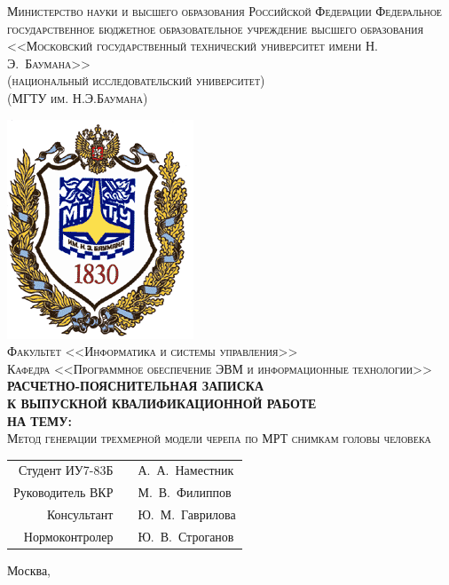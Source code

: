 \newcommand{\HRule}{\rule{\linewidth}{0.5mm}}
\fontsize{14}{14pt}\selectfont
\begin{center}

\textsc{
Министерство науки и высшего образования Российской Федерации
Федеральное государственное бюджетное образовательное учреждение 
высшего образования\\
<<Московский государственный технический университет имени Н.\,Э.~Баумана>>\\
(национальный исследовательский университет)\\
(МГТУ им. Н.Э.Баумана)\\}

\includegraphics[scale=0.5]{tex/bmstu-logo.png}\\

\textsc{Факультет <<Информатика и системы управления>>}\\
\textsc{Кафедра <<Программное обеспечение ЭВМ и информационные технологии>>}\\[1cm]

\textsc{\large \bfseries РАСЧЕТНО-ПОЯСНИТЕЛЬНАЯ ЗАПИСКА\\К ВЫПУСКНОЙ КВАЛИФИКАЦИОННОЙ РАБОТЕ\\НА ТЕМУ:}\\[1cm]

\textsc{\large Метод генерации трехмерной модели черепа по МРТ снимкам головы человека}

\vfill

\begin{flushright}
  \begin{tabular}{rll}
    Студент ИУ7-83Б & \underline{\hspace{6cm}} & А.~А.~Наместник\\[0.5cm]
    Руководитель ВКР & \underline{\hspace{6cm}} & М.~В.~Филиппов\\[0.5cm]
    Консультант & \underline{\hspace{6cm}} & Ю.~М.~Гаврилова\\ [0.5cm]
    Нормоконтролер & \underline{\hspace{6cm}} & Ю.~В.~Строганов\\[0.5cm]
  \end{tabular}
\end{flushright}

{\large Москва, \the\year}

\end{center}

\newpage
{}